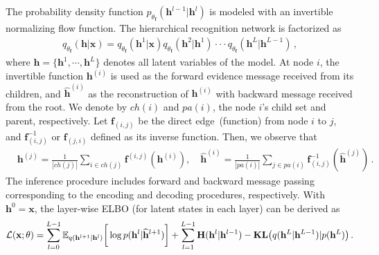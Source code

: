 \documentclass{article} %
\begin{document}
The probability density function $p_{\theta_{\mathbf{f}}}(\mathbf{h}^{l-1} | \mathbf{h}^{l})$ is modeled with an invertible normalizing flow function.
The hierarchical recognition network is factorized as
\begin{align*}
q_{\theta_{\mathbf{f}}}(\mathbf{h}| \mathbf{x}) =  q_{\theta_{\mathbf{f}}}(\mathbf{h}^1 | \mathbf{x})  q_{\theta_{\mathbf{f}}}(\mathbf{h}^2 | \mathbf{h}^1) \cdot \cdot  \cdot  q_{\theta_{\mathbf{f}}}(\mathbf{h}^{L} | \mathbf{h}^{L-1}) \, ,
\end{align*}
where $\mathbf{h}=\{\mathbf{h}^1, \cdots, \mathbf{h}^L \}$ denotes all latent variables of the model.
At node $i$, the invertible function $\mathbf{h}^{(i)}$ is used as the forward evidence message received from its children, and $\widehat{\mathbf{h}}^{(i)}$ as the  reconstruction of $\mathbf{h}^{(i)}$ with backward message received from the root. 
We denote by $ch(i)$ and $pa(i)$, the node $i$'s child set and parent, respectively. 
Let $\mathbf{f}_{(i, j)}$ be the direct edge~(function) from node $i$ to $j$, and $\mathbf{f}^{-1}_{ (i, j)}$ or  $\mathbf{f}_{ (j, i)}$ defined as its inverse function.  
Then, we observe that
\begin{align*}
&  \mathbf{h}^{(j)} = \frac{1}{|ch(j)|} \sum_{i \in ch(j) } \mathbf{f}^{(i,j)}(\mathbf{h}^{(i)}),  \quad \widehat{\mathbf{h}}^{(i)} = \frac{1}{|pa(i)|} \sum_{j \in pa(i) } \mathbf{f}^{-1}_{ (i,j)}(\widehat{\mathbf{h}}^{(j)}) \, .
\end{align*} 
The inference procedure includes forward and backward message passing corresponding to the encoding and decoding procedures, respectively. 
With $\mathbf{h}^0 = \mathbf{x}$, the layer-wise ELBO (for latent states in each layer) can be derived as 
\begin{align} \label{eq:elbo_tree}
\mathcal{L}(\mathbf{x}; \theta) =  \sum_{l=0}^{L-1}  \mathbb{E}_{q(\mathbf{h}^{l+1}|\mathbf{h}^l)} \bigg[ \log p( \mathbf{h}^{l}|  \widehat{\mathbf{h}}^{l+1})   \bigg] +  \sum_{l=1}^{L-1}   \textbf{\text{H}}(\mathbf{h}^l | \mathbf{h}^{l-1} )   -   \textbf{\text{KL}}\big(q(\mathbf{h}^L | \mathbf{h}^{L-1} )   | p(\mathbf{h}^L)  \big) \, .  
\end{align}
\end{document}
